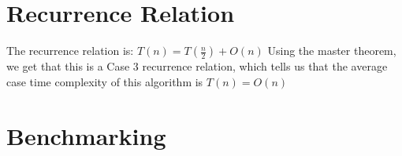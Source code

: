 \documentclass{labReport}
\begin{document}
\begin{multicols*}{2}
\section{Recurrence Relation}
The recurrence relation is:
$T(n) = T(\frac{n}{2})+O(n)$
Using the master theorem, we get that this is a Case 3 recurrence relation, which tells us that the average case time complexity of this algorithm is $T(n) = O(n)$

\section{Benchmarking}

\end{multicols*}

\end{document}
